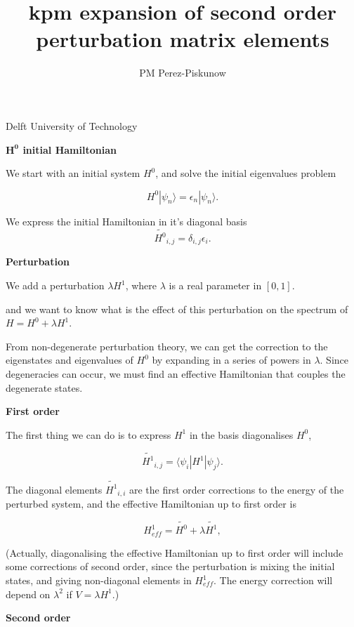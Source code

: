 \documentclass[10pt, onecolumn, aps, prb, superscriptaddress, floatfix, showpacs, notitlepage]{revtex4-1}
\newcommand{\bra}[1]{\langle #1|}
\newcommand{\ket}[1]{|#1\rangle}
\begin{document}
\author{PM Perez-Piskunow}
\affiliation
{Delft University of Technology}

\title{kpm expansion of second order perturbation matrix elements}

\maketitle

\textbf{$\mathbf{H^0}$ initial Hamiltonian}

We start with an initial system $H^0$, and solve the initial
eigenvalues problem

$$
H^0 \ket{\psi_n} = \epsilon_n \ket{\psi_n}.
$$

We express the initial Hamiltonian in it's diagonal basis
$$
\tilde{H^0}_{i,j} = \delta_{i,j}\epsilon_i.
$$

\textbf{Perturbation}

We add a perturbation $\lambda H^1$, where $\lambda$ is a real parameter in $[0,1]$.

and we want to know what is the effect of this perturbation on the spectrum
of $H = H^0 + \lambda H^1$.

From non-degenerate perturbation theory, we can get the correction to the
eigenstates and eigenvalues of $H^0$ by expanding in a series of powers in
$\lambda$. Since degeneracies can occur, we must find an effective Hamiltonian
that couples the degenerate states.


\textbf{First order}

The first thing we can do is to express $H^1$ in the basis diagonalises $H^0$,

$$
\tilde{H^1}_{i,j} = \bra{\psi_i} H^1 \ket{\psi_j}.
$$

The diagonal elements $\tilde{H^1}_{i,i}$ are the first order corrections
to the energy of the perturbed system, and the effective Hamiltonian up to
first order is

$$
H_{eff}^1 = \tilde{H^0} + \lambda\tilde{H^1},
$$


(Actually, diagonalising the effective
Hamiltonian up to first order will include some corrections of second order,
since the perturbation is mixing the initial states, and giving non-diagonal elements
in $H_{eff}^1$. The energy correction will depend on $\lambda^2$ if $V=\lambda H^1$.)


\textbf{Second order}
\end{document}
